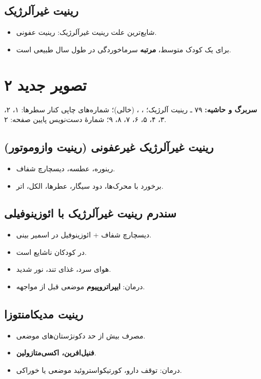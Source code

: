 \documentclass[12pt,a4paper]{article}
\begin{document}
\subsection*{رینیت غیرآلرژیک}
\begin{itemize}
\item شایع‌ترین علت رینیت غیرآلرژیک: رینیت عفونی.
\item برای یک کودک متوسط، \textbf{ مرتبه} سرماخوردگی در طول سال طبیعی است.
\end{itemize}

\clearpage\section*{تصویر جدید ۲}
\textbf{سربرگ و حاشیه:}  ۷۹ ـ رینیت آلرژیک؛
، ،  (خالی)؛
شماره‌های چاپی کنار سطرها: ۱، ۲، ۳، ۴، ۵، ۶، ۷، ۸، ۹؛ شمارهٔ دست‌نویس پایین صفحه: ۲.

\subsection*{رینیت غیرآلرژیک غیرعفونی (رینیت وازوموتور)}
\begin{itemize}
\item رینوره، عطسه، دیسچارچ شفاف.
\item برخورد با محرک‌ها، دود سیگار، عطرها، الکل، اتر.
\end{itemize}

\subsection*{سندرم رینیت غیرآلرژیک با ائوزینوفیلی}
\begin{itemize}
\item دیسچارچ شفاف + ائوزینوفیل در اسمیر بینی.
\item در کودکان ناشایع است.
\item هوای سرد، غذای تند، نور شدید.
\item درمان: \textbf{ایپراتروپیوم} موضعی قبل از مواجهه.
\end{itemize}

\subsection*{رینیت مدیکامنتوزا}
\begin{itemize}
\item مصرف بیش از حد دکونژستان‌های موضعی.
\item \textbf{فنیل‌افرین، اکسی‌متازولین}.
\item درمان: توقف دارو، کورتیکواستروئید موضعی یا خوراکی.
\end{itemize}
\end{document}
